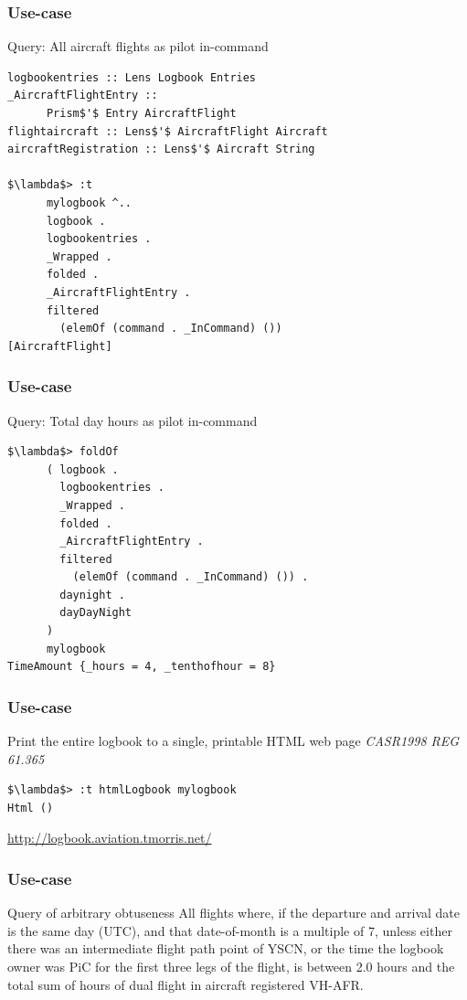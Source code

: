 \begin{frame}[fragile]
\frametitle{Use-case}
\begin{block}{Query: All aircraft flights as pilot in-command}
\begin{lstlisting}[style=haskell,basicstyle=\scriptsize\ttfamily,mathescape]
logbookentries :: Lens Logbook Entries
_AircraftFlightEntry ::
      Prism$'$ Entry AircraftFlight
flightaircraft :: Lens$'$ AircraftFlight Aircraft
aircraftRegistration :: Lens$'$ Aircraft String

$\lambda$> :t
      mylogbook ^..
      logbook .
      logbookentries .
      _Wrapped .
      folded .
      _AircraftFlightEntry .
      filtered
        (elemOf (command . _InCommand) ())
[AircraftFlight]
\end{lstlisting}
\end{block}
\end{frame}

\begin{frame}[fragile]
\frametitle{Use-case}
\begin{block}{Query: Total day hours as pilot in-command}
\begin{lstlisting}[style=haskell,basicstyle=\scriptsize\ttfamily,mathescape]
$\lambda$> foldOf
      ( logbook .
        logbookentries .
        _Wrapped .
        folded .
        _AircraftFlightEntry .
        filtered
          (elemOf (command . _InCommand) ()) .
        daynight .
        dayDayNight
      )
      mylogbook
TimeAmount {_hours = 4, _tenthofhour = 8}
\end{lstlisting}
\end{block}
\end{frame}

\begin{frame}[fragile]
\frametitle{Use-case}
\begin{block}{Print the entire logbook to a single, printable HTML web page \emph{CASR1998 REG 61.365}}
\begin{lstlisting}[style=haskell,mathescape]
$\lambda$> :t htmlLogbook mylogbook
Html ()
\end{lstlisting}
\end{block}
\href{http://logbook.aviation.tmorris.net/}{http://logbook.aviation.tmorris.net/}
\end{frame}

\begin{frame}[fragile]
\frametitle{Use-case}
\begin{block}{Query of arbitrary obtuseness}
All flights where, if the departure and arrival date is the same day (UTC), and that date-of-month is a multiple of 7, unless either there was an intermediate flight path point of YSCN, or the time the logbook owner was PiC for the first three legs of the flight, is between 2.0 hours and the total sum of hours of dual flight in aircraft registered VH-AFR.
\end{block}
\end{frame}
